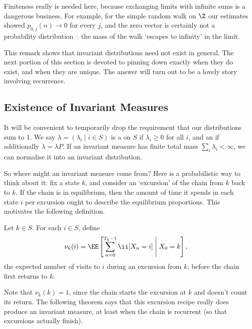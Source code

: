 \begin{remark}
	Finiteness really is needed here, because exchanging limits with infinite sums is a dangerous business. For example, for the simple random walk on $\Z$ our estimates showed $p_{0, j}(n) \rightarrow 0$ for every $j$, and the zero vector is certainly not a probability distribution -- the mass of the walk `escapes to infinity' in the limit.
\end{remark}

This remark shows that invariant distributions need not exist in general. The next portion of this section is devoted to pinning down exactly when they do exist, and when they are unique. The answer will turn out to be a lovely story involving recurrence.

\subsection{Existence of Invariant Measures}

It will be convenient to temporarily drop the requirement that our distributions sum to 1. We say $\lambda = (\lambda_i \mid i \in S)$ is a  on $S$ if $\lambda_i \geq 0$ for all $i$, and an  if additionally $\lambda = \lambda P$. If an invariant measure has finite total mass $\sum_i \lambda_i < \infty$, we can normalise it into an invariant distribution.

So where might an invariant measure come from? Here is a probabilistic way to think about it: fix a state $k$, and consider an `excursion' of the chain from $k$ back to $k$. If the chain is in equilibrium, then the amount of time it spends in each state $i$ per excursion ought to describe the equilibrium proportions. This motivates the following definition.

\begin{definition}
	Let $k \in S$. For each $i \in S$, define
	$$
	\nu_k(i) = \EE\left[\sum_{n = 0}^{T_k - 1} \ii[X_n = i] \;\middle|\; X_0 = k\right],
	$$
	the expected number of visits to $i$ during an excursion from $k$, before the chain first returns to $k$.
\end{definition}

Note that $\nu_k(k) = 1$, since the chain starts the excursion at $k$ and doesn't count its return. The following theorem says that this excursion recipe really does produce an invariant measure, at least when the chain is recurrent (so that excursions actually finish).

